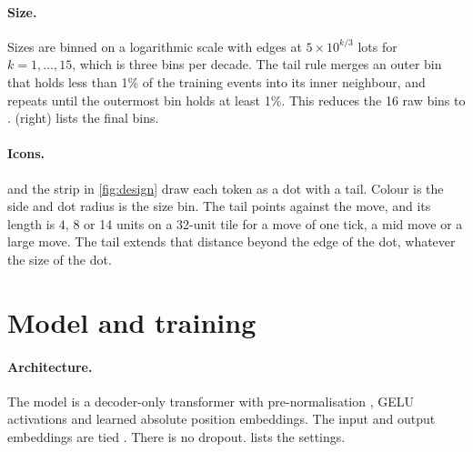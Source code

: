 \documentclass[11pt]{article}
\begin{document}
\paragraph{Size.}
Sizes are binned on a logarithmic scale with edges at $5\times 10^{k/3}$ lots for $k=1,\dots,15$, which is three bins per decade.
The tail rule merges an outer bin that holds less than 1\% of the training events into its inner neighbour, and repeats until the outermost bin holds at least 1\%.
This reduces the 16 raw bins to \NSize{}.
 (right) lists the final bins.

\begin{table}[h]
\centering\small
\begin{minipage}[t]{0.42\linewidth}\centering\end{minipage}
\hfill
\begin{minipage}[t]{0.52\linewidth}\centering\end{minipage}
\caption{Left: the seven price-move classes and their shares of training events. Right: the size bins and their shares.}
\label{tab:vocab}
\end{table}

\paragraph{Icons.}
 and the strip in \cref{fig:design} draw each token as a dot with a tail.
Colour is the side and dot radius is the size bin.
The tail points against the move, and its length is 4, 8 or 14 units on a 32-unit tile for a move of one tick, a mid move or a large move.
The tail extends that distance beyond the edge of the dot, whatever the size of the dot.

\section{Model and training}\label{app:model}

\paragraph{Architecture.}
The model is a decoder-only transformer with pre-normalisation \citep{xiong2020}, GELU activations \citep{hendrycks2016} and learned absolute position embeddings.
The input and output embeddings are tied \citep{press2017}.
There is no dropout.
 lists the settings.
\end{document}
